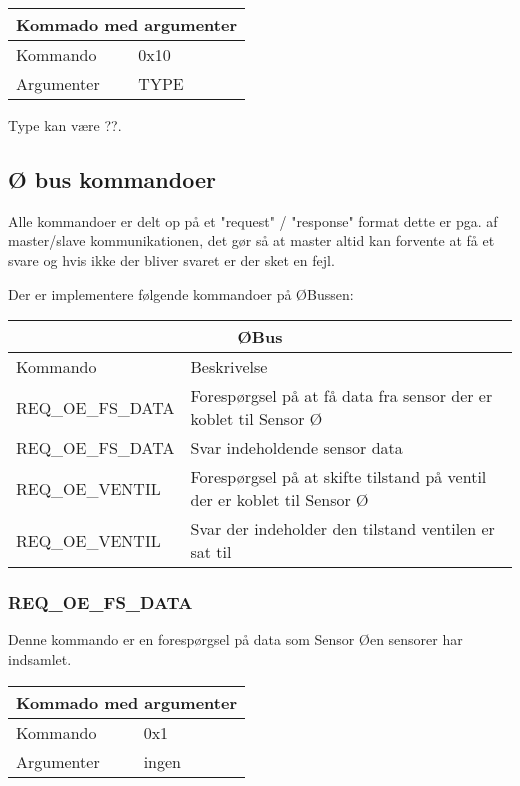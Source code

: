 \begin{table}[H]
\setlength{\parindent}{12pt}
\begin{tabular}{|l|lcc|}
\hline
\multicolumn{4}{|c|}{Kommado med argumenter}\\\hline
Kommando & 0x10 & & \\
Argumenter & TYPE & & \\\hline
\end{tabular}
\end{table}

Type kan være ??.

\subsection{Ø bus kommandoer}
Alle kommandoer er delt op på et "request" / "response" format dette er pga. af master/slave kommunikationen, det gør så at master altid kan forvente at få et svare og hvis ikke der bliver svaret er der sket en fejl.

Der er implementere følgende kommandoer på ØBussen:

\begin{table}[H]
\setlength{\parindent}{12pt}
\begin{tabular}{|l|l|}\hline
\multicolumn{2}{|c|}{ØBus\cellcolor[gray]{0.7}}\\\hline
Kommando & Beskrivelse \\\hline
REQ\_OE\_FS\_DATA 		& Forespørgsel på at få data fra sensor der er koblet til Sensor Ø \\\hline 
REQ\_OE\_FS\_DATA 		& Svar indeholdende sensor data								 \\\hline 
REQ\_OE\_VENTIL	   		& Forespørgsel på at skifte tilstand på ventil der er koblet til Sensor Ø \\\hline 
REQ\_OE\_VENTIL       		& Svar der indeholder den tilstand ventilen er sat til \\\hline 
\end{tabular}
\end{table}

\subsubsection{REQ\_OE\_FS\_DATA}
Denne kommando er en forespørgsel på data som Sensor Øen sensorer har indsamlet.

\begin{table}[H]
\setlength{\parindent}{12pt}
\begin{tabular}{|l|lcc|}
\hline
\multicolumn{4}{|c|}{Kommado med argumenter}\\\hline
Kommando & 0x1 & & \\
Argumenter & ingen & & \\\hline
\end{tabular}
\end{table}



